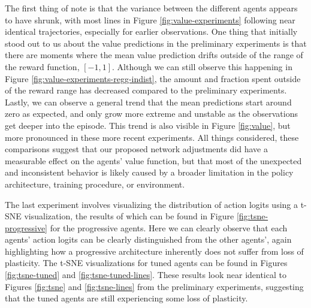 The first thing of note is that the variance between the different agents appears to have shrunk, with most lines in Figure \ref{fig:value-experiments} following near identical trajectories, especially for earlier observations.
One thing that initially stood out to us about the value predictions in the preliminary experiments is that there are moments where the mean value prediction drifts outside of the range of the reward function, $[-1,1]$.
Although we can still observe this happening in Figure \ref{fig:value-experiments-regg-indist}, the amount and fraction spent outside of the reward range has decreased compared to the preliminary experiments.
Lastly, we can observe a general trend that the mean predictions start around zero as expected, and only grow more extreme and unstable as the observations get deeper into the episode.
This trend is also visible in Figure \ref{fig:value}, but more pronounced in these more recent experiments.
All things considered, these comparisons suggest that our proposed network adjustments did have a measurable effect on the agents' value function, but that most of the unexpected and inconsistent behavior is likely caused by a broader limitation in the policy architecture, training procedure, or environment.

The last experiment involves visualizing the distribution of action logits using a t-SNE visualization, the results of which can be found in Figure \ref{fig:tsne-progressive} for the progressive agents.
Here we can clearly observe that each agents' action logits can be clearly distinguished from the other agents', again highlighting how a progressive architecture inherently does not suffer from loss of plasticity.
The t-SNE visualizations for tuned agents can be found in Figures \ref{fig:tsne-tuned} and \ref{fig:tsne-tuned-lines}.
These results look near identical to Figures \ref{fig:tsne} and \ref{fig:tsne-lines} from the preliminary experiments, suggesting that the tuned agents are still experiencing some loss of plasticity.
